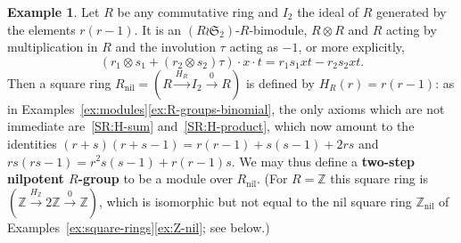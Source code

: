 \documentclass[reqno,a4paper]{amsart}
\theoremstyle{plain}
\theoremstyle{definition}
\newtheorem{example}[subsection]{Example}
\newcommand{\defn}{\textbf}
\newcommand{\Z}{\ensuremath{\mathbb{Z}}}
\DeclareMathOperator{\nil}{nil}
\newcommand{\sqring}[4]{\ensuremath{(#1\xrightarrow{#3}#2\xrightarrow{#4}#1)}}
\begin{document}
\begin{example}\label{ex:R-groups-any-ring}
  Let \(R\) be any commutative ring and \(I_{2}\) the ideal of \(R\) generated by the elements \(r(r-1)\). It is an \((R\wr\mathfrak{S}_{2})\)-\(R\)-bimodule, \(R\otimes R\) and \(R\) acting by multiplication in \(R\) and the involution \(\tau\) acting as \(-1\), or more explicitly,
  \[
    (r_{1}\otimes s_{1}+(r_{2}\otimes s_{2})\tau)\cdot x\cdot t=r_{1}s_{1}xt-r_{2}s_{2}xt\text{.}
  \]
  Then a square ring \(R_{\nil}=\sqring{R}{I_{2}}{H_{R}}{0}\) is defined by \(H_{R}(r)=r(r-1)\): as in Examples~\ref{ex:modules}\ref{ex:R-groups-binomial}, the only axioms which are not immediate are~\ref{SR:H-sum} and~\ref{SR:H-product}, which now amount to the identities \((r+s)(r+s-1)=r(r-1)+s(s-1)+2rs\) and \(rs(rs-1)=r^{2}s(s-1)+r(r-1)s\). We may thus define a \defn{two-step nilpotent \(R\)-group} to be a module over \(R_{\nil}\). (For \(R=\Z\) this square ring is \(\sqring{\Z}{2\Z}{H_{\Z}}{0}\), which is isomorphic but not equal to the nil square ring \(\Z_{\nil}\) of Examples~\ref{ex:square-rings}\ref{ex:Z-nil}; see below.)


\end{example}
\end{document}
